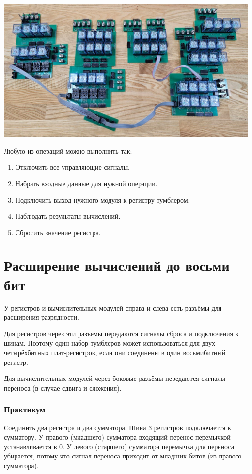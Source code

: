 \includegraphics[width=\columnwidth]{photo/calculator.jpg}

Любую из операций можно выполнить так:

\begin{enumerate}
    \item Отключить все управляющие сигналы.
    \item Набрать входные данные для нужной операции.
    \item Подключить выход нужного модуля к регистру тумблером.
    \item Наблюдать результаты вычислений.
    \item Сбросить значение регистра.
\end{enumerate}


\section{Расширение вычислений до восьми бит}

У регистров и вычислительных модулей справа и слева есть разъёмы для расширения разрядности.

Для регистров через эти разъёмы передаются сигналы сброса и подключения к шинам. Поэтому
один набор тумблеров может использоваться для двух четырёхбитных плат-регистров, если они
соединены в один восьмибитный регистр.

Для вычислительных модулей через боковые разъёмы передаются сигналы переноса (в случае сдвига и сложения).

\subsubsection{Практикум}

Соединить два регистра и два сумматора. Шина $3$ регистров подключается к сумматору.
У правого (младшего) сумматора входящий перенос перемычкой устанавливается в $0$.
У левого (старшего) сумматора перемычка для переноса убирается, потому что
сигнал переноса приходит от младших битов (из правого сумматора).

